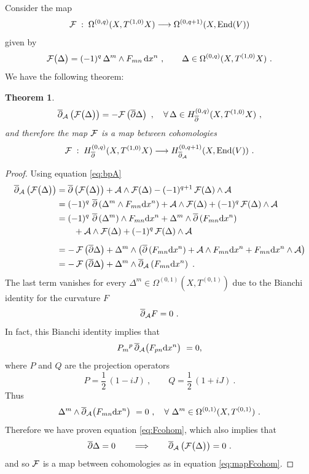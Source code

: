 \documentclass[12pt,a4paper]{article}
\newcommand{\half}{\frac{1}{2}}
\def\bar#1{\overline{#1}}
\def\d{\textrm{d}}
\def\End{\textrm{End}}
\def\bp{\bar{\partial}}
\newtheorem{Theorem}{Theorem}
\theoremstyle{definition}
\begin{document}
Consider the map 
\begin{equation}
\label{eq:mapF}
{\cal F}\;:\;\Omega^{(0,q)}(X,T^{(1,0)}X)\longrightarrow \Omega^{(0,q+1)}(X,\End(V))
\end{equation}
given by
\begin{equation}
{\cal F}\big(\Delta\big)= (-1)^q\, \Delta{}^m\wedge F_{mn}\, \d x^n~,
\qquad \Delta\in\Omega^{(0,q)}(X,T^{(1,0)}X)~.
\label{eq:mapFdef}
\end{equation}
We have the following theorem: 
\begin{Theorem}\label{prop:one}
\begin{equation}
\bp_{\cal A} \left({\cal F}\big(\Delta\big)\right) = - {\cal F}\left(\bp\Delta\right)~,
\quad\forall\, \Delta\in H_{\bp}^{(0,q)}(X,T^{(1,0)}X)~,
\label{eq:Fcohom}
\end{equation}
and therefore the map ${\cal F}$ is a map between cohomologies
\begin{equation}
\label{eq:mapFcohom}
{\cal F}\;:\;H_{\bp}^{(0,q)}(X,T^{(1,0)}X)\longrightarrow H_{\bp_{\cal A}}^{(0,q+1)}(X,{\rm End}(V))~.
\end{equation}
\end{Theorem}

\begin{proof}
Using equation \eqref{eq:bpA}
\begin{align*}
\bp_{\cal A} \left({\cal F}\big(\Delta\big)\right)&=
\bp\left({\cal F}\big(\Delta\big)\right) + {\cal A}\wedge {\cal F}(\Delta) - (-1)^{q+1}\, {\cal F}(\Delta)\wedge{\cal A}
\\
&= (-1)^q\ \bp\left(\Delta^m\wedge F_{mn}\d x^n\right) +
{\cal A}\wedge {\cal F}(\Delta) + (-1)^q\, {\cal F}(\Delta)\wedge{\cal A}
\\
&= (-1)^q\ \bp\left(\Delta^m\right)\wedge F_{mn}\d x^n +
\Delta^m\wedge \bp\left(F_{mn}\d x^n\right) \\
&\qquad
+ {\cal A}\wedge {\cal F}(\Delta) + (-1)^q\, {\cal F}(\Delta)\wedge{\cal A}\\[5pt]
&= - \, {\cal F}\left(\bp\Delta\right) +
\Delta^m\wedge\left( 
\bp\left(F_{mn}\d x^n\right)  +  {\cal A}\wedge F_{mn}\d x^n+ F_{mn}\d x^n\wedge{\cal A}
\right)\\
&= - \, {\cal F}\left(\bp\Delta\right) +
\Delta^m\wedge \bp_{\cal A}\left(F_{mn}\d x^n\right)~. 
\end{align*}
The last term vanishes for every $\Delta^m\in \Omega^{(0,1)}(X, T^{(0,1)})$ due to the Bianchi identity for the curvature $F$
\[\bp_{\cal A} F = 0~.\]
In fact, this Bianchi identity implies that
\begin{equation}
P_{m}{}^p\,\bp_{\cal A} \big(F_{pn}\d x^n\big)~ = 0,  \label{eq:strongBIF}
\end{equation}
where $P$ and $Q$ are the projection operators
\[ P = \half\, (1 -  i J)~,\qquad Q = \half\, (1 +  i J)~.\]
Thus
\[ \Delta^m\wedge\bp_{\cal A} \big(F_{mn}\d x^n\big)~ = 0~,\quad\forall\ 
\Delta^m\in \Omega^{(0,1)}(X, T^{(0,1)})~.\]
Therefore 
we have proven equation \eqref{eq:Fcohom}, which also implies that
\[\bp\Delta = 0\qquad\Longrightarrow \qquad \bp_{\cal A}\left({\cal F}\big(\Delta\big)\right) = 0~.\]
and so $\cal F$ is a map between cohomologies as in equation \eqref{eq:mapFcohom}.
\end{proof}
\end{document}
